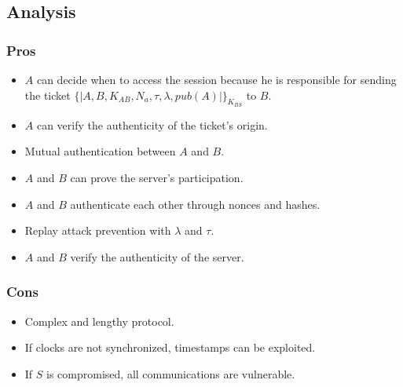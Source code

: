 \subsection{Analysis}
\subsubsection{Pros}
\begin{itemize}
    \item $A$ can decide when to access the session because he is responsible for sending the ticket $\{|A,B,K_{AB},N_a, \tau, \lambda, pub(A) |\}_{K_{BS}}$ to $B$.
    \item $A$ can verify the authenticity of the ticket’s origin.
    \item Mutual authentication between $A$ and $B$.
    \item $A$ and $B$ can prove the server’s participation.
    \item $A$ and $B$ authenticate each other through nonces and hashes.
    \item Replay attack prevention with $\lambda$ and $\tau$.
    \item $A$ and $B$ verify the authenticity of the server.
\end{itemize}

\subsubsection{Cons}
\begin{itemize}
    \item Complex and lengthy protocol.
    \item If clocks are not synchronized, timestamps can be exploited.
    \item If $S$ is compromised, all communications are vulnerable.
\end{itemize}
